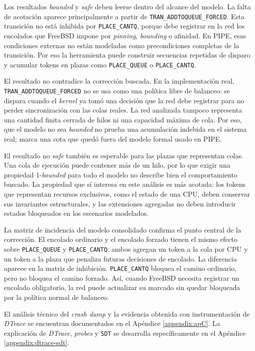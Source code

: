 Los resultados \textit{bounded} y \textit{safe} deben leerse dentro del alcance del modelo. La falta de acotación aparece principalmente a partir de \verb|TRAN_ADDTOQUEUE_FORCED|. Esta transición no está inhibida por \verb|PLACE_CANTQ|, porque debe registrar en la red los encolados que FreeBSD impone por \textit{pinning}, \textit{bounding} o afinidad. En PIPE, esas condiciones externas no están modeladas como precondiciones completas de la transición. Por eso la herramienta puede construir secuencias repetidas de disparo y acumular tokens en plazas como \verb|PLACE_QUEUE| o \verb|PLACE_CANTQ|.\par

El resultado no contradice la corrección buscada. En la implementación real, \verb|TRAN_ADDTOQUEUE_FORCED| no se usa como una política libre de balanceo: se dispara cuando el \textit{kernel} ya tomó una decisión que la red debe registrar para no perder sincronización con las colas reales. La red analizada tampoco representa una cantidad finita cerrada de hilos ni una capacidad máxima de cola. Por eso, que el modelo no sea \textit{bounded} no prueba una acumulación indebida en el sistema real; marca una cota que quedó fuera del modelo formal usado en PIPE.\par

El resultado no \textit{safe} también es esperable para las plazas que representan colas. Una cola de ejecución puede contener más de un hilo, por lo que exigir una propiedad 1-\textit{bounded} para todo el modelo no describe bien el comportamiento buscado. La propiedad que sí interesa en este análisis es más acotada: los tokens que representan recursos exclusivos, como el estado de una CPU, deben conservar sus invariantes estructurales, y las extensiones agregadas no deben introducir estados bloqueados en los escenarios modelados.\par

La matriz de incidencia del modelo consolidado confirma el punto central de la corrección. El encolado ordinario y el encolado forzado tienen el mismo efecto sobre \verb|PLACE_QUEUE| y \verb|PLACE_CANTQ|: ambos agregan un token a la cola por CPU y un token a la plaza que penaliza futuras decisiones de encolado. La diferencia aparece en la matriz de inhibición. \verb|PLACE_CANTQ| bloquea el camino ordinario, pero no bloquea el camino forzado. Así, cuando FreeBSD necesita registrar un encolado obligatorio, la red puede actualizar su marcado sin quedar bloqueada por la política normal de balanceo.\par

El análisis técnico del \textit{crash dump} y la evidencia obtenida con instrumentación de \textit{DTrace} se encuentran documentados en el Apéndice \ref{appendix:apC}. La explicación de \textit{DTrace}, \textit{probes} y \verb|SDT| se desarrolla específicamente en el Apéndice \ref{appendix:dtrace-sdt}.\par
